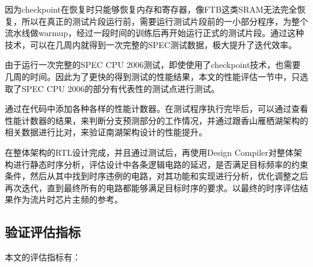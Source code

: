 因为checkpoint在恢复时只能够恢复内存和寄存器，像FTB这类SRAM无法完全恢复，所以在真正的测试片段运行前，需要运行测试片段前的一小部分程序，为整个流水线做warmup，经过一段时间的训练后再开始运行正式的测试片段。通过这种技术，可以在几周内就得到一次完整的SPEC测试数据，极大提升了迭代效率。

由于运行一次完整的SPEC CPU 2006测试，即使使用了checkpoint技术，也需要几周的时间。因此为了更快的得到测试的性能结果，本文的性能评估一节中，只选取了SPEC CPU 2006的部分有代表性的测试点进行测试。

通过在代码中添加各种各样的性能计数器。在测试程序执行完毕后，可以通过查看性能计数器的结果，来判断分支预测部分的工作情况，并通过跟香山雁栖湖架构的相关数据进行比对，来验证南湖架构设计的性能提升。

在整体架构的RTL设计完成，并且通过测试后，再使用Design Compiler对整体架构进行静态时序分析，评估设计中各条逻辑电路的延迟，是否满足目标频率的约束条件，然后从其中找到时序违例的电路，对其功能和实现进行分析，优化调整之后再次迭代，直到最终所有的电路都能够满足目标时序的要求。以最终的时序评估结果作为流片时芯片主频的参考。

\subsection{验证评估指标}

本文的评估指标有：

